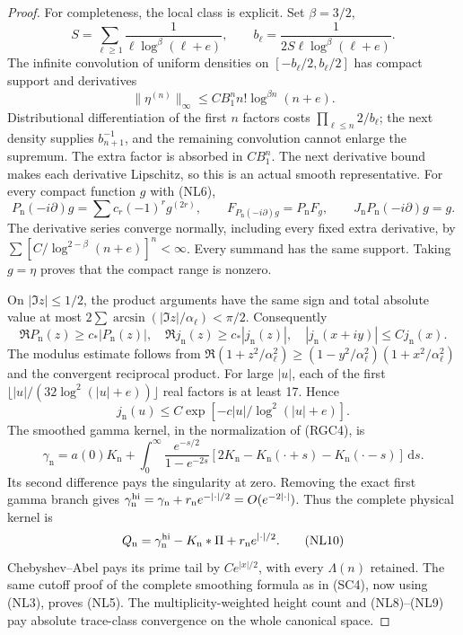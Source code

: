 \documentclass[11pt]{article}
\theoremstyle{remark}\newtheorem{remark}[theorem]{Remark}
\newcommand{\dd}{\,\mathrm d}
\begin{document}
\begin{proof}
For completeness, the local class is explicit. Set \(\beta=3/2\),
\[
 S=\sum_{\ell\ge1}\frac1{\ell\log^\beta(\ell+e)},\qquad
 b_\ell=\frac1{2S\ell\log^\beta(\ell+e)}.
\]
The infinite convolution of uniform densities on
\([-b_\ell/2,b_\ell/2]\) has compact support and derivatives
\[
 \|\eta^{(n)}\|_\infty\le CB_1^n n!\log^{\beta n}(n+e).          \tag{NL6}
\]
Distributional differentiation of the first \(n\) factors costs
\(\prod_{\ell\le n}2/b_\ell\); the next density supplies
\(b_{n+1}^{-1}\), and the remaining convolution cannot enlarge
the supremum. The extra factor is absorbed in \(CB_1^n\).
The next derivative bound makes each derivative Lipschitz,
so this is an actual smooth representative.
For every compact function \(g\) with (NL6),
\[
 P_{\mathrm n}(-i\partial)g
     =\sum c_r(-1)^rg^{(2r)},\qquad
 F_{P_{\mathrm n}(-i\partial)g}=P_{\mathrm n}F_g,\qquad
 J_{\mathrm n}P_{\mathrm n}(-i\partial)g=g.                     \tag{NL7}
\]
The derivative series converge normally, including every fixed
extra derivative, by
\(\sum[C/\log^{2-\beta}(n+e)]^n<\infty\).
Every summand has the same support. Taking \(g=\eta\)
proves that the compact range is nonzero.

On \(|\Im z|\le1/2\), the product arguments have the same sign
and total absolute value at most
\(2\sum\arcsin(|\Im z|/\alpha_\ell)<\pi/2\).
Consequently
\[
 \Re P_{\mathrm n}(z)\ge c_*|P_{\mathrm n}(z)|,\quad
 \Re j_{\mathrm n}(z)\ge c_*|j_{\mathrm n}(z)|,\quad
 |j_{\mathrm n}(x+iy)|\le Cj_{\mathrm n}(x).                    \tag{NL8}
\]
The modulus estimate follows from
\(\Re(1+z^2/\alpha_\ell^2)\ge
 (1-y^2/\alpha_\ell^2)(1+x^2/\alpha_\ell^2)\)
and the convergent reciprocal product.
For large \(|u|\), each of the first
\(\lfloor |u|/(32\log^2(|u|+e))\rfloor\) real factors
is at least 17. Hence
\[
 j_{\mathrm n}(u)\le C
       \exp[-c|u|/\log^2(|u|+e)].                              \tag{NL9}
\]
The smoothed gamma kernel, in the normalization of (RGC4), is
\[
 \gamma_{\mathrm n}=a(0)K_{\mathrm n}
 +\int_0^\infty\frac{e^{-s/2}}{1-e^{-2s}}
       [2K_{\mathrm n}-K_{\mathrm n}(\cdot+s)
                         -K_{\mathrm n}(\cdot-s)]\dd s.
\]
Its second difference pays the singularity at zero. Removing
the exact first gamma branch gives
\(\gamma_{\mathrm n}^{\rm hi}
 =\gamma_{\mathrm n}+r_{\mathrm n}e^{-|\cdot|/2}
 =O(e^{-2|\cdot|})\). Thus the complete physical kernel is
\[
 Q_{\mathrm n}=\gamma_{\mathrm n}^{\rm hi}
       -K_{\mathrm n}*\Pi+r_{\mathrm n}e^{|\cdot|/2}.            \tag{NL10}
\]
Chebyshev--Abel pays its prime tail by \(Ce^{|x|/2}\),
with every \(\Lambda(n)\) retained.
The same cutoff proof of the complete smoothing formula as in
(SC4), now using (NL3), proves (NL5).
The multiplicity-weighted height count and (NL8)--(NL9) pay
absolute trace-class convergence on the whole canonical space.


\end{proof}
\end{document}
